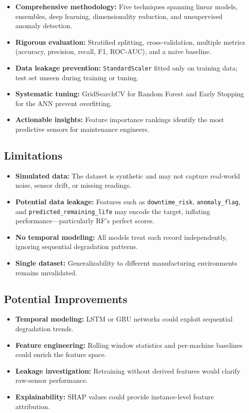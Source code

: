 \documentclass[11pt]{article}
\begin{document}
\begin{itemize}[noitemsep]
    \item \textbf{Comprehensive methodology:} Five techniques spanning linear models, ensembles, deep learning, dimensionality reduction, and unsupervised anomaly detection.
    \item \textbf{Rigorous evaluation:} Stratified splitting, cross-validation, multiple metrics (accuracy, precision, recall, F1, ROC-AUC), and a naive baseline.
    \item \textbf{Data leakage prevention:} \texttt{StandardScaler} fitted only on training data; test set unseen during training or tuning.
    \item \textbf{Systematic tuning:} GridSearchCV for Random Forest and Early Stopping for the ANN prevent overfitting.
    \item \textbf{Actionable insights:} Feature importance rankings identify the most predictive sensors for maintenance engineers.
\end{itemize}

\subsection{Limitations}

\begin{itemize}[noitemsep]
    \item \textbf{Simulated data:} The dataset is synthetic and may not capture real-world noise, sensor drift, or missing readings.
    \item \textbf{Potential data leakage:} Features such as \texttt{downtime\_risk}, \texttt{anomaly\_flag}, and \texttt{predicted\_remaining\_life} may encode the target, inflating performance---particularly RF's perfect scores.
    \item \textbf{No temporal modeling:} All models treat each record independently, ignoring sequential degradation patterns.
    \item \textbf{Single dataset:} Generalizability to different manufacturing environments remains unvalidated.
\end{itemize}

\subsection{Potential Improvements}

\begin{itemize}[noitemsep]
    \item \textbf{Temporal modeling:} LSTM or GRU networks could exploit sequential degradation trends.
    \item \textbf{Feature engineering:} Rolling window statistics and per-machine baselines could enrich the feature space.
    \item \textbf{Leakage investigation:} Retraining without derived features would clarify raw-sensor performance.
    \item \textbf{Explainability:} SHAP values could provide instance-level feature attribution.
\end{itemize}
\end{document}

